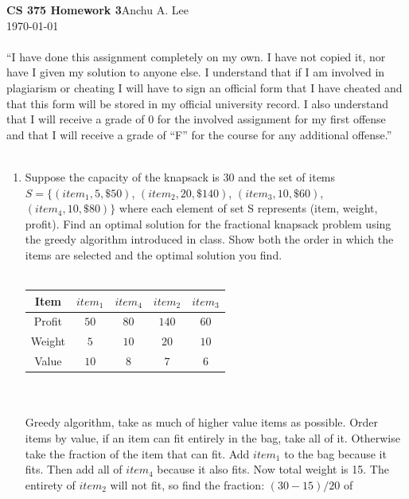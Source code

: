 \documentclass{article}
\begin{document}
    \noindent\textbf{CS 375 Homework 3}\hfill Anchu A. Lee\\
    \noindent\today
    \\\\“I have done this assignment completely on my own. I have not copied it, nor have I given my solution to anyone else. I understand that if I am involved in plagiarism or cheating I will have to sign an official form that I have cheated and that this form will be stored in my official university record. I also understand that I will receive a grade of 0 for the involved assignment for my first offense and that I will receive a grade of “F” for the course for any additional offense.” 
    \\\\
    \begin{enumerate}
        \item Suppose the capacity of the knapsack is 30 and the set of items 
        $S = \{(item_1, 5, \$50)$, $(item_2, 20, \$140)$, $(item_3, 10, \$60)$, 
        $(item_4, 10, \$80)\}$ where each element of set S represents (item, 
        weight, profit). Find an optimal solution for the fractional knapsack 
        problem using the greedy algorithm introduced in class. Show both the 
        order in which the items are selected and the optimal solution you 
        find.\\\\
            \begin{tabular}{| c || c | c | c | c |}
                \hline
                Item & $item_1$ & $item_4$ & $item_2$ & $item_3$ \\
                \hline
                Profit & $50$ & $80$ & $140$ & $60$ \\ 
                \hline
                Weight & $5$ & $10$ & $20$ & $10$ \\
                \hline
                Value & $10$ & $8$ & $7$ & $6$ \\
                \hline
            \end{tabular} \\\\ 
            Greedy algorithm, take as much of higher value items as possible.
            Order items by value, if an item can fit entirely in the bag, take
            all of it. Otherwise take the fraction of the item that can fit.
            Add $item_1$ to the bag because it fits. Then add all of $item_4$
            because it also fits. Now total weight is 15. The entirety of 
            $item_2$ will not fit, so find the fraction: $(30 - 15)/20$ of 

\end{enumerate}
\end{document}
